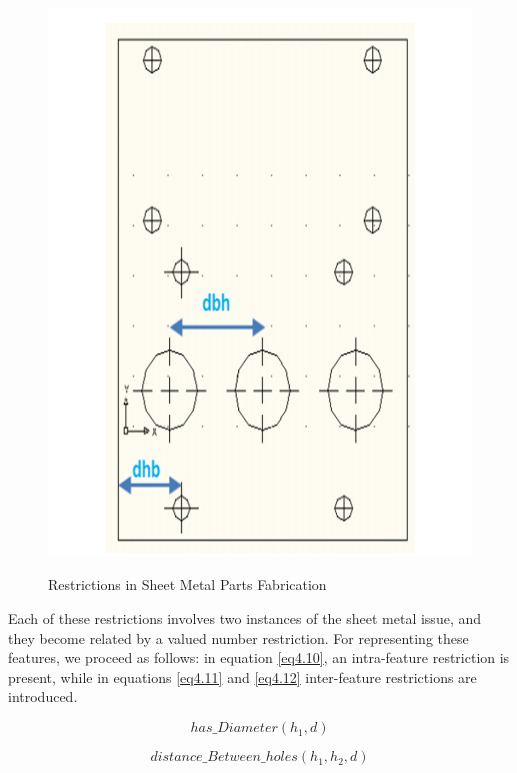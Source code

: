 \begin{figure}
\begin{center}
	\includegraphics[scale=0.5]{figure-chapterIV/fig4-35}\\
	\caption{Restrictions in Sheet Metal Parts Fabrication  }
	\label{figure4-35}
\end{center}
\end{figure}


Each of these restrictions involves two  instances of the sheet metal issue, and they become related by a valued number restriction. For representing these features, we proceed as follows: in equation \ref{eq4.10}, an intra-feature restriction is present, while in equations \ref{eq4.11} and \ref{eq4.12} inter-feature restrictions are introduced.

\begin{equation}\label{eq4.10}
has\_Diameter(h_{1},d)
\end{equation}

\begin{equation}\label{eq4.11}
distance\_Between\_holes(h_{1}, h_{2}, d)
\end{equation}

